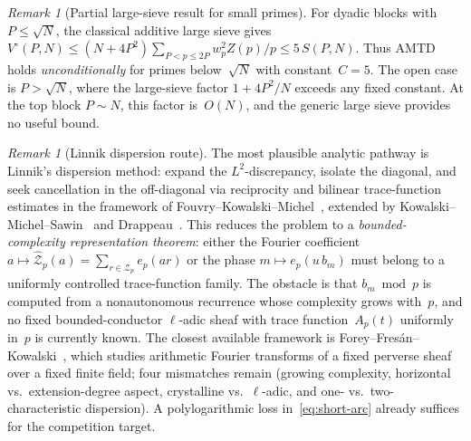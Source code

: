 \documentclass[11pt]{article}
\theoremstyle{definition}
\theoremstyle{remark}
\newtheorem{remark}[theorem]{Remark}
\begin{document}
\begin{remark}[Partial large-sieve result for small primes]
\label{rem:partial-ls}
For dyadic blocks with $P \le \sqrt{N}$,
the classical additive large sieve gives
$V^\circ(P,N) \le (N + 4P^2)\sum_{P < p \le 2P}
w_p^2 Z(p)/p \le 5\,S(P,N)$.
Thus AMTD holds \emph{unconditionally} for
primes below~$\sqrt{N}$ with constant~$C = 5$.
The open case is $P > \sqrt{N}$,
where the large-sieve factor $1 + 4P^2/N$
exceeds any fixed constant.
At the top block $P \sim N$,
this factor is~$O(N)$, and the generic
large sieve provides no useful bound.
\end{remark}

\begin{remark}[Linnik dispersion route]\label{rem:linnik}
The most plausible analytic pathway is
Linnik's dispersion method: expand the
$L^2$-discrepancy, isolate the diagonal,
and seek cancellation in the off-diagonal
via reciprocity and bilinear trace-function
estimates in the framework of
Fouvry--Kowalski--Michel~\cite{FouvryKM2014},
extended by
Kowalski--Michel--Sawin~\cite{KMS2017}
and Drappeau~\cite{Drappeau2017}.
This reduces the problem to a
\emph{bounded-complexity representation
theorem}: either the Fourier coefficient
$a \mapsto \hat{\mathcal{Z}}_p(a)
= \sum_{r \in \mathcal{Z}_p} e_p(ar)$
or the phase $m \mapsto e_p(u\,b_m)$
must belong to a uniformly controlled
trace-function family.
The obstacle is that $b_m \bmod p$ is
computed from a nonautonomous recurrence
whose complexity grows with~$p$, and
no fixed bounded-conductor $\ell$-adic
sheaf with trace function~$A_p(t)$
uniformly in~$p$ is currently known.
The closest available framework is
Forey--Fres\'an--Kowalski~\cite{FFK2023},
which studies arithmetic Fourier transforms
of a fixed perverse sheaf over a fixed
finite field; four mismatches remain
(growing complexity, horizontal vs.\
extension-degree aspect, crystalline vs.\
$\ell$-adic, and one- vs.\ two-characteristic
dispersion).
A polylogarithmic loss in~\eqref{eq:short-arc}
already suffices for the competition target.
\end{remark}
\end{document}
